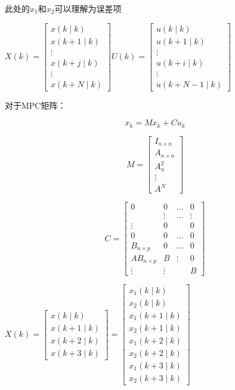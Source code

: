 此处的$x_{1}$和$x_{2}$可以理解为误差项

$X(k)=\left[\begin{array}{c}x(k \mid k) \\x(k+1 \mid k) \\\vdots\\ x(k+j \mid k)\\\vdots \\x(k+N \mid k)\end{array}\right]$$U(k)=\left[\begin{array}{c}u(k \mid k) \\u(k+1 \mid k) \\\vdots\\ u(k+i \mid k)\\\vdots \\u(k+N-1 \mid k)\end{array}\right]$

对于MPC矩阵：

$$
x_{k}=M x_{k}+C u_{k}
$$

$$
M=\left[\begin{array}{c}I_{n \times n} \\A_{n \times n} \\A_{n}^{2} \\\vdots \\A^{N}\end{array}\right]
$$

$$
C=\left[\begin{array}{cccc}
0 & 0 & \ldots & 0 \\
& \vdots & \ldots & \vdots \\
\vdots & 0 & & 0 \\
0 & 0 & \ldots & 0 \\
B_{n \times p} & 0 & \ldots & 0 \\
A B_{n \times p} & B & \vdots & 0 \\
\vdots & \vdots & & B
\end{array}\right]
$$

$X(k)=\left[\begin{array}{c}x(k \mid k) \\x(k+1 \mid k) \\x(k+2 \mid k) \\x(k+3 \mid k)\end{array}\right]=\left[\begin{array}{c}x_{1}(k \mid k) \\x_{2}(k \mid k) \\x_{1}(k+1 \mid k) \\x_{2}(k+1 \mid k) \\x_{1}(k+2 \mid k) \\x_{2}(k+2 \mid k) \\x_{1}(k+3 \mid k) \\x_{2}(k+3 \mid k)\end{array}\right]$

